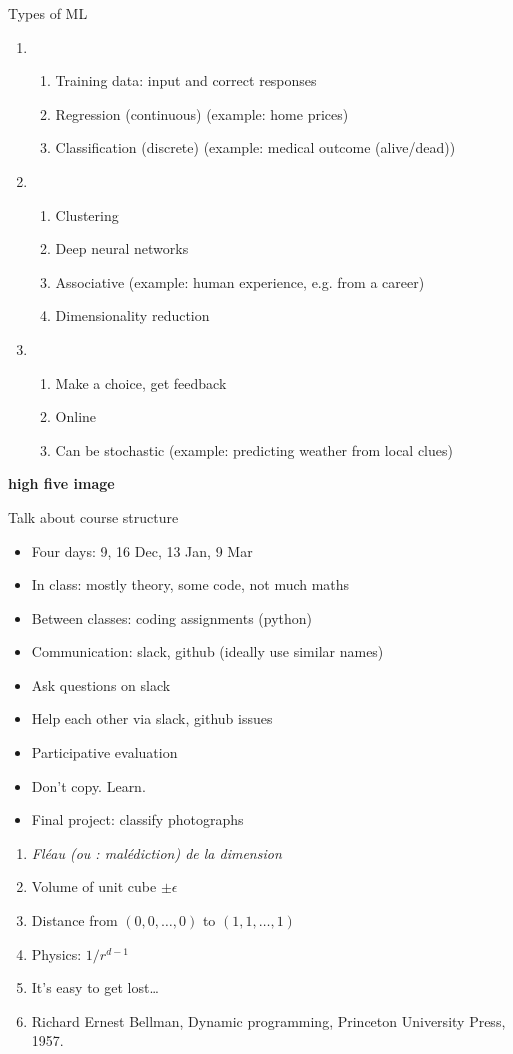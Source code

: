 Types of ML
\begin{enumerate}
\item {}
  \begin{enumerate}
  \item Training data: input and correct responses
  \item Regression (continuous) (example: home prices)
  \item Classification (discrete) (example: medical outcome (alive/dead))
  \end{enumerate}
\item {}
  \begin{enumerate}
  \item Clustering
  \item Deep neural networks
  \item Associative (example: human experience, e.g. from a career)
  \item Dimensionality reduction
  \end{enumerate}
\item {}
  \begin{enumerate}
  \item Make a choice, get feedback
  \item Online
  \item Can be stochastic (example: predicting weather from local clues)
  \end{enumerate}
\end{enumerate}

\textbf{high five image}

Talk about course structure
\begin{itemize}
\item Four days: 9, 16 Dec, 13 Jan, 9 Mar
\item In class: mostly theory, some code, not much maths
\item Between classes: coding assignments (python)
\item Communication: slack, github (ideally use similar names)
\item Ask questions on slack
\item Help each other via slack, github issues
\item Participative evaluation
\item Don't copy.  Learn.
\item Final project: classify photographs
\end{itemize}

\begin{enumerate}
\item \textit{Fléau (ou : malédiction) de la dimension}
\item Volume of unit cube $\pm\epsilon$
\item Distance from $(0,0,\ldots,0)$ to $(1,1,\ldots,1)$
\item Physics: $1/r^{d-1}$
\item It's easy to get lost\dots
\item Richard Ernest Bellman, Dynamic programming, Princeton
  University Press, 1957.
\end{enumerate}

